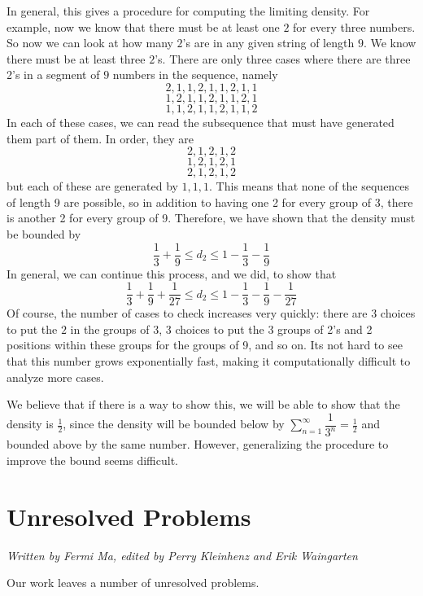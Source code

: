 \documentclass[runningheads,a4paper]{llncs}
\begin{document}
In general, this gives a procedure for computing the limiting density. For example, now we know that there must be at least one $2$ for every three numbers. So now we can look at how many $2$'s are in any given string of length $9$. We know there must be at least three $2$'s. There are only three cases where there are three 2's in a segment of $9$ numbers in the sequence, namely
\[ 2, 1, 1, 2, 1, 1 ,2 , 1, 1 \]
\[ 1, 2, 1, 1, 2, 1, 1, 2, 1 \]
\[ 1, 1, 2, 1, 1, 2, 1, 1, 2 \]
In each of these cases, we can read the subsequence that must have generated them part of them. In order, they are
\[ 2, 1, 2, 1, 2 \]
\[ 1, 2, 1, 2, 1\]
\[ 2, 1, 2, 1, 2 \]
but each of these are generated by $1, 1, 1$. This means that none of the sequences of length 9 are possible, so in addition to having one 2 for every group of 3, there is another 2 for every group of 9. Therefore, we have shown that the density must be bounded by
\[ \dfrac{1}{3} + \dfrac{1}{9} \leq d_2 \leq 1 - \dfrac{1}{3} - \dfrac{1}{9} \]
In general, we can continue this process, and we did, to show that
\[ \dfrac{1}{3} + \dfrac{1}{9} + \dfrac{1}{27} \leq d_2 \leq 1 - \dfrac{1}{3} - \dfrac{1}{9} - \dfrac{1}{27} \]
Of course, the number of cases to check increases very quickly: there are $3$ choices to put the $2$ in the groups of $3$, $3$ choices to put the 3 groups of 2's and 2 positions within these groups for the groups of 9, and so on. Its not hard to see that this number grows exponentially fast, making it computationally difficult to analyze more cases.

We believe that if there is a way to show this, we will be able to show that the density is $\frac{1}{2}$, since the density will be bounded below by $\sum_{n=1}^\infty \dfrac{1}{3^n} = \frac{1}{2}$ and bounded above by the same number. However, generalizing the procedure to improve the bound seems difficult.

\section{Unresolved Problems}
\emph{Written by Fermi Ma, edited by Perry Kleinhenz and Erik Waingarten}

Our work leaves a number of unresolved problems. 
\end{document}
